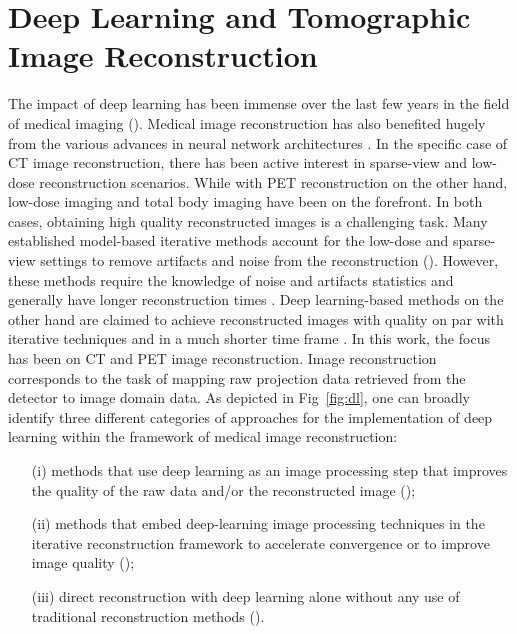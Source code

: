 
\chapter{Deep Learning and Tomographic Image Reconstruction} %

\label{Chapter3} %

The impact of deep learning has been immense over the last few years in the field of medical imaging (\cite{litjens2017survey, greenspan2016guest}). Medical image reconstruction has also benefited hugely from the various advances in neural network architectures \cite{wang2020deep,yedder2021deep,reader2020deep}. In the specific case of \ac{CT} image reconstruction, there has been active interest in sparse-view and low-dose reconstruction scenarios. While with \ac{PET} reconstruction on the other hand, low-dose imaging and total body imaging have been on the forefront. In both cases, obtaining high quality reconstructed images is a challenging task. Many established model-based iterative methods account for the low-dose and sparse-view settings to remove artifacts and noise from the reconstruction (\cite{nuyts1998iterative,Elbakri2002,liu2013total}). However, these methods require the knowledge of noise and artifacts statistics and generally have longer reconstruction times \cite{kim2014combining}. Deep learning-based methods on the other hand are claimed to achieve reconstructed images with quality on par with iterative techniques and in a much shorter time frame \cite{leuschner2021quantitative}. In this work, the focus has been on \ac{CT} and \ac{PET} image reconstruction. 
Image reconstruction corresponds to the task of mapping raw projection data retrieved from the detector to image domain data. As depicted in Fig~\ref{fig:dl}, one can broadly identify three different categories of approaches for the implementation of deep learning within the framework of medical image reconstruction:
\begin{itemize}
	\item[(i)] methods that use deep learning as an image processing step that improves the quality of the raw data and/or the reconstructed image (\cite{gong2018pet, maier2018deep}); 
	\item[(ii)] methods that embed deep-learning image processing techniques in the iterative reconstruction framework to accelerate convergence or to improve image quality (\cite{xie2019generative,kim2018penalized,gong2019iterative});
	\item[(iii)] direct reconstruction with deep learning alone without any use of traditional reconstruction methods  (\cite{whiteley2019direct,zhu2018image,haeggstroem2018deeprec}).
\end{itemize}

